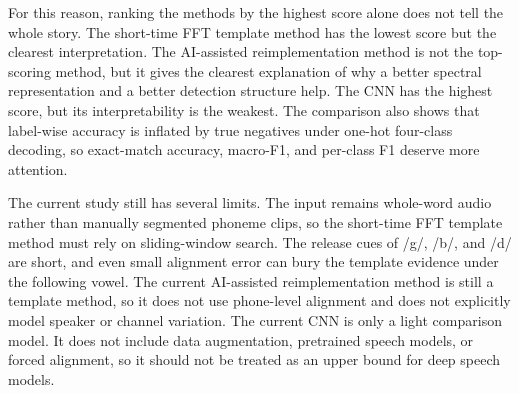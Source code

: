 For this reason, ranking the methods by the highest score alone does not tell the whole story. The short-time FFT template method has the lowest score but the clearest interpretation. The AI-assisted reimplementation method is not the top-scoring method, but it gives the clearest explanation of why a better spectral representation and a better detection structure help. The CNN has the highest score, but its interpretability is the weakest. The comparison also shows that label-wise accuracy is inflated by true negatives under one-hot four-class decoding, so exact-match accuracy, macro-F1, and per-class F1 deserve more attention.

The current study still has several limits. The input remains whole-word audio rather than manually segmented phoneme clips, so the short-time FFT template method must rely on sliding-window search. The release cues of /g/, /b/, and /d/ are short, and even small alignment error can bury the template evidence under the following vowel. The current AI-assisted reimplementation method is still a template method, so it does not use phone-level alignment and does not explicitly model speaker or channel variation. The current CNN is only a light comparison model. It does not include data augmentation, pretrained speech models, or forced alignment, so it should not be treated as an upper bound for deep speech models.
